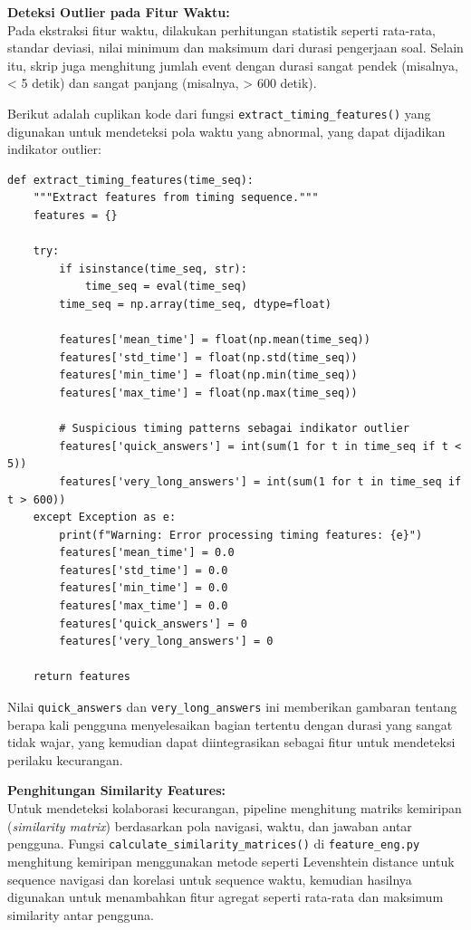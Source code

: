 \textbf{Deteksi Outlier pada Fitur Waktu:} \\
Pada ekstraksi fitur waktu, dilakukan perhitungan statistik seperti rata-rata, standar deviasi, nilai minimum dan maksimum dari durasi pengerjaan soal. Selain itu, skrip juga menghitung jumlah event dengan durasi sangat pendek (misalnya, < 5 detik) dan sangat panjang (misalnya, > 600 detik).

Berikut adalah cuplikan kode dari fungsi \texttt{extract\_timing\_features()} yang digunakan untuk mendeteksi pola waktu yang abnormal, yang dapat dijadikan indikator outlier:

\begin{verbatim}
def extract_timing_features(time_seq):
    """Extract features from timing sequence."""
    features = {}
    
    try:
        if isinstance(time_seq, str):
            time_seq = eval(time_seq)
        time_seq = np.array(time_seq, dtype=float)
        
        features['mean_time'] = float(np.mean(time_seq))
        features['std_time'] = float(np.std(time_seq))
        features['min_time'] = float(np.min(time_seq))
        features['max_time'] = float(np.max(time_seq))
        
        # Suspicious timing patterns sebagai indikator outlier
        features['quick_answers'] = int(sum(1 for t in time_seq if t < 5))
        features['very_long_answers'] = int(sum(1 for t in time_seq if t > 600))
    except Exception as e:
        print(f"Warning: Error processing timing features: {e}")
        features['mean_time'] = 0.0
        features['std_time'] = 0.0
        features['min_time'] = 0.0
        features['max_time'] = 0.0
        features['quick_answers'] = 0
        features['very_long_answers'] = 0
    
    return features
\end{verbatim}

Nilai \texttt{quick\_answers} dan \texttt{very\_long\_answers} ini memberikan gambaran tentang berapa kali pengguna menyelesaikan bagian tertentu dengan durasi yang sangat tidak wajar, yang kemudian dapat diintegrasikan sebagai fitur untuk mendeteksi perilaku kecurangan.

\textbf{Penghitungan Similarity Features:} \\
Untuk mendeteksi kolaborasi kecurangan, pipeline menghitung matriks kemiripan (\textit{similarity matrix}) berdasarkan pola navigasi, waktu, dan jawaban antar pengguna. Fungsi \texttt{calculate\_similarity\_matrices()} di \texttt{feature\_eng.py} menghitung kemiripan menggunakan metode seperti Levenshtein distance untuk sequence navigasi dan korelasi untuk sequence waktu, kemudian hasilnya digunakan untuk menambahkan fitur agregat seperti rata-rata dan maksimum similarity antar pengguna.



